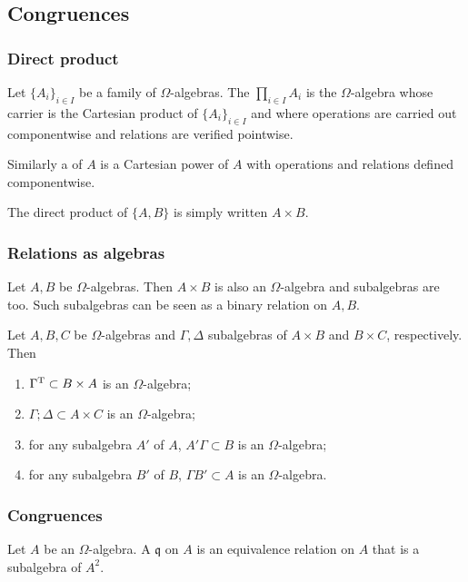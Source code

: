 \subsection{Congruences}
\subsubsection{Direct product}
\begin{definition}
Let $\{A_i\}_{i\in I}$ be a family of $\Omega$-algebras. The  $\prod_{i\in I} A_i$ is the $\Omega$-algebra whose carrier is the Cartesian product of $\{A_i\}_{i\in I}$ and where operations are carried out componentwise and relations are verified pointwise.

Similarly a  of $A$ is a Cartesian power of $A$ with operations and relations defined componentwise.
\end{definition}

The direct product of $\{A,B\}$ is simply written $A\times B$.

\subsubsection{Relations as algebras}
Let $A,B$ be $\Omega$-algebras. Then $A\times B$ is also an $\Omega$-algebra and subalgebras are too. Such subalgebras can be seen as a binary relation on $A,B$.

\begin{lemma}
Let $A,B,C$ be $\Omega$-algebras and $\Gamma, \Delta$ subalgebras of $A\times B$ and $B\times C$, respectively. Then
\begin{enumerate}
\item $\Gamma^{\mathrm{T}} \subset B\times A$ is an $\Omega$-algebra;
\item $\Gamma;\Delta \subset A\times C$ is an $\Omega$-algebra;
\item for any subalgebra $A'$ of $A$, $A'\Gamma \subset B$ is an $\Omega$-algebra;
\item for any subalgebra $B'$ of $B$, $\Gamma B' \subset A$ is an $\Omega$-algebra.
\end{enumerate}
\end{lemma}

\subsubsection{Congruences}
\begin{definition}
Let $A$ be an $\Omega$-algebra. A  $\mathfrak{q}$ on $A$ is an equivalence relation on $A$ that is a subalgebra of $A^2$.
\end{definition}

